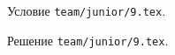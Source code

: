 \problem
Условие \texttt{team/junior/9.tex}.

\solution Решение \texttt{team/junior/9.tex}.
\endproblem

